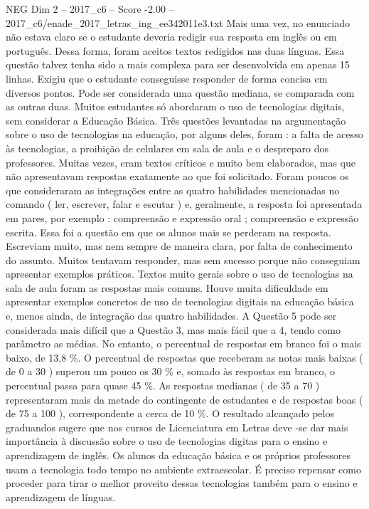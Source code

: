 \begin{textsample}{NEG Dim 2 – 2017\_c6 – Score -2.00 – 2017\_c6/enade\_2017\_letras\_ing\_ee342011e3.txt}
Mais uma vez, no enunciado não estava claro se o estudante deveria redigir sua resposta em inglês ou em português.
Dessa forma, foram aceitos textos redigidos nas duas línguas.
Essa questão talvez tenha sido a mais complexa para ser desenvolvida em apenas 15 linhas.
Exigiu que o estudante conseguisse responder de forma concisa em diversos pontos.
Pode ser considerada uma questão mediana, se comparada com as outras duas.
Muitos estudantes só abordaram o uso de tecnologias digitais, sem considerar a Educação Básica.
Três questões levantadas na argumentação sobre o uso de tecnologias na educação, por alguns deles, foram : a falta de acesso às tecnologias, a proibição de celulares em sala de aula e o despreparo dos professores.
Muitas vezes, eram textos críticos e muito bem elaborados, mas que não apresentavam respostas exatamente ao que foi solicitado.
Foram poucos os que consideraram as integrações entre as quatro habilidades mencionadas no comando ( ler, escrever, falar e escutar ) e, geralmente, a resposta foi apresentada em pares, por exemplo : compreensão e expressão oral ; compreensão e expressão escrita.
Essa foi a questão em que os alunos mais se perderam na resposta.
Escreviam muito, mas nem sempre de maneira clara, por falta de conhecimento do assunto.
Muitos tentavam responder, mas sem sucesso porque não conseguiam apresentar exemplos práticos.
Textos muito gerais sobre o uso de tecnologias na sala de aula foram as respostas mais comuns.
Houve muita dificuldade em apresentar exemplos concretos de uso de tecnologias digitais na educação básica e, menos ainda, de integração das quatro habilidades.
A Questão 5 pode ser considerada mais difícil que a Questão 3, mas mais fácil que a 4, tendo como parâmetro as médias.
No entanto, o percentual de respostas em branco foi o mais baixo, de 13,8 \%.
O percentual de respostas que receberam as notas mais baixas ( de 0 a 30 ) superou um pouco os 30 \% e, somado às respostas em branco, o percentual passa para quase 45 \%.
As respostas medianas ( de 35 a 70 ) representaram mais da metade do contingente de estudantes e de respostas boas ( de 75 a 100 ), correspondente a cerca de 10 \%.
O resultado alcançado pelos graduandos sugere que nos cursos de Licenciatura em Letras deve -se dar mais importância à discussão sobre o uso de tecnologias digitas para o ensino e aprendizagem de inglês.
Os alunos da educação básica e os próprios professores usam a tecnologia todo tempo no ambiente extraescolar.
É preciso repensar como proceder para tirar o melhor proveito dessas tecnologias também para o ensino e aprendizagem de línguas.

\end{textsample}
